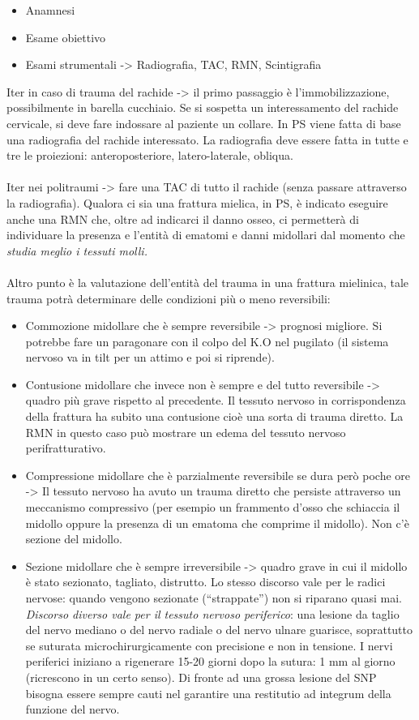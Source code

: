 \begin{itemize}
\item
  Anamnesi
\item
  Esame obiettivo
\item
  Esami strumentali -> Radiografia, TAC, RMN, Scintigrafia
\end{itemize}

Iter in caso di trauma del rachide -> il primo passaggio è l'immobilizzazione, possibilmente in barella cucchiaio. Se si sospetta un interessamento del rachide cervicale, si deve fare indossare al paziente un collare. In PS viene fatta di base una radiografia del rachide interessato. La radiografia deve essere fatta in tutte e tre le proiezioni: anteroposteriore, latero-laterale, obliqua.
\\\\
Iter nei politraumi -> fare una TAC di tutto il rachide (senza passare attraverso la radiografia). Qualora ci sia una frattura mielica, in PS, è indicato eseguire anche una RMN che, oltre ad indicarci il danno osseo, ci permetterà di individuare la presenza e l'entità di ematomi e danni midollari dal momento che \emph{studia meglio i tessuti molli.}
\\\\
Altro punto è la valutazione dell'entità del trauma in una frattura mielinica, tale trauma potrà determinare delle condizioni più o meno reversibili:

\begin{itemize}
\item
  Commozione midollare che è sempre reversibile -> prognosi migliore. Si potrebbe fare un paragonare con il colpo del K.O nel pugilato (il sistema nervoso va in tilt per un attimo e poi si riprende).
\item
  Contusione midollare che invece non è sempre e del tutto reversibile -> quadro più grave rispetto al precedente. Il tessuto nervoso in corrispondenza della frattura ha subito una contusione cioè una sorta di trauma diretto. La RMN in questo caso può mostrare un edema del tessuto nervoso perifratturativo.
\item
  Compressione midollare che è parzialmente reversibile se dura però poche ore -> Il tessuto nervoso ha avuto un trauma diretto che persiste attraverso un meccanismo compressivo (per esempio un frammento d'osso che schiaccia il midollo oppure la presenza di un ematoma che comprime il midollo). Non c'è sezione del midollo.
\item
  Sezione midollare che è sempre irreversibile -> quadro grave in cui il midollo è stato sezionato, tagliato, distrutto. Lo stesso discorso vale per le radici nervose: quando vengono sezionate (``strappate'') non si riparano quasi mai. \emph{Discorso diverso vale per il tessuto nervoso periferico}: una lesione da taglio del nervo mediano o del nervo radiale o del nervo ulnare guarisce, soprattutto se suturata microchirurgicamente con precisione e non in tensione. I nervi periferici iniziano a rigenerare 15-20 giorni dopo la sutura: 1 mm al giorno (ricrescono in un certo senso). Di fronte ad una grossa lesione del SNP bisogna essere sempre cauti nel garantire una restitutio ad integrum della funzione del nervo.
\end{itemize}

